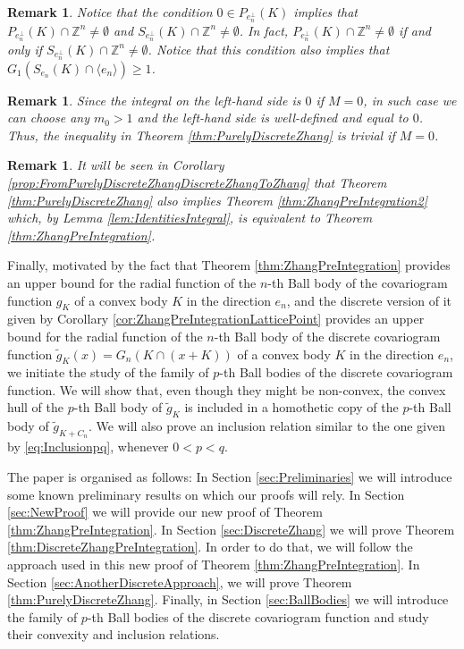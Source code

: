 \documentclass[10pt]{amsart}
\newtheorem{rmk}[thm]{Remark}
\def\Z{\mathbb{Z}}
\numberwithin{equation}{section}
\begin{document}
\begin{rmk}\label{rmk:Condition0InProjection}
Notice that the condition $0\in P_{e_n^\perp}(K)$ implies that $P_{e_n^\perp}(K)\cap\Z^n\neq\emptyset$ and $S_{e_n^\perp}(K)\cap\Z^n\neq\emptyset$. In fact, $P_{e_n^\perp}(K)\cap\Z^n\neq\emptyset$ if and only if $S_{e_n^\perp}(K)\cap\Z^n\neq\emptyset$. Notice that this condition also implies that $G_1(S_{e_n}(K)\cap\langle e_n\rangle)\geq1$.
\end{rmk}

\begin{rmk}\label{rmk:RemarkM=0}
Since the integral on the left-hand side is $0$ if $M=0$, in such case we can choose any $m_0>1$ and the left-hand side is well-defined and equal to $0$. Thus, the inequality in Theorem \ref{thm:PurelyDiscreteZhang} is trivial if $M=0$.
\end{rmk}

\begin{rmk}
It will be seen in  Corollary \ref{prop:FromPurelyDiscreteZhangDiscreteZhangToZhang} that Theorem \ref{thm:PurelyDiscreteZhang} also implies Theorem \ref{thm:ZhangPreIntegration2} which, by Lemma \ref{lem:IdentitiesIntegral}, is equivalent to Theorem \ref{thm:ZhangPreIntegration}.
\end{rmk}

Finally, motivated by the fact that Theorem \ref{thm:ZhangPreIntegration} provides an upper bound for the radial function of the $n$-th Ball body of the covariogram function $g_K$ of a convex body $K$ in the direction $e_n$, and the discrete version of it given by Corollary \ref{cor:ZhangPreIntegrationLatticePoint} provides an upper bound for the radial function of the $n$-th Ball body of the discrete covariogram function $\tilde{g}_K(x)=G_n(K\cap(x+K))$ of a convex body $K$ in the direction $e_n$, we initiate the study of the family of $p$-th Ball bodies of the discrete covariogram function.  We will show that, even though they might be non-convex, the convex hull of the $p$-th Ball body of $\tilde{g}_K$ is included in a homothetic copy of the $p$-th Ball body of $\tilde{g}_{K+C_n}$. We will also prove an inclusion relation similar to the one given by \eqref{eq:Inclusionpq}, whenever $0<p<q$.



The paper is organised as follows: In Section \ref{sec:Preliminaries} we will introduce some known preliminary results on which our proofs will rely. In Section \ref{sec:NewProof} we will provide our new proof of Theorem \ref{thm:ZhangPreIntegration}. In Section  \ref{sec:DiscreteZhang} we will prove Theorem \ref{thm:DiscreteZhangPreIntegration}. In order to do that, we will follow the approach used in this new proof of Theorem \ref{thm:ZhangPreIntegration}. In Section \ref{sec:AnotherDiscreteApproach}, we will prove Theorem \ref{thm:PurelyDiscreteZhang}. Finally, in Section \ref{sec:BallBodies} we will introduce the family of $p$-th Ball bodies of the discrete covariogram function and study their convexity and inclusion relations.
\end{document}
